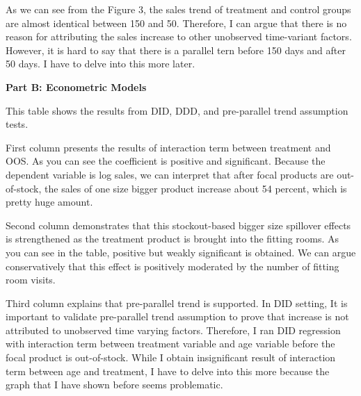 \documentclass[letterpaper,12pt]{article}
\theoremstyle{definition}
\begin{document}
	As we can see from the Figure 3, the sales trend of treatment and control groups are almost identical between 150 and 50. Therefore, I can argue that there is no reason for attributing the sales increase to other unobserved time-variant factors. 
	However, it is hard to say that there is a parallel tern before 150 days and after 50 days. 
	I have to delve into this more later.  
	
	 
	 \vspace{5mm}
	 
	 \textbf{Part B: Econometric Models} 
	 


 This table shows the results from DID, DDD, and pre-parallel trend assumption tests. 
 
  \vspace{1mm}
  
  First column presents the results of interaction term between treatment and OOS. As you can see the coefficient is positive and significant. Because the dependent variable is log sales, we can interpret that after focal products are out-of-stock, the sales of one size bigger product increase about 54 percent, which is pretty huge amount. 
  
   \vspace{1mm}
   
   Second column demonstrates that this stockout-based bigger size spillover effects is strengthened as the treatment product is brought into the fitting rooms. As you can see in the table, positive but weakly significant is obtained. We can argue conservatively that this effect is positively moderated by the number of fitting room visits. 
   
    
   \vspace{1mm}
   
   Third column explains that pre-parallel trend is supported. In DID setting, It is important to validate pre-parallel trend assumption to prove that increase is not attributed to unobserved time varying factors. Therefore, I ran DID regression with interaction term between treatment variable and age variable before the focal product is out-of-stock. While I obtain insignificant result of interaction term between age and treatment, I have to delve into this more because the graph that I have shown before seems problematic. 




	 
	  
\end{document}
